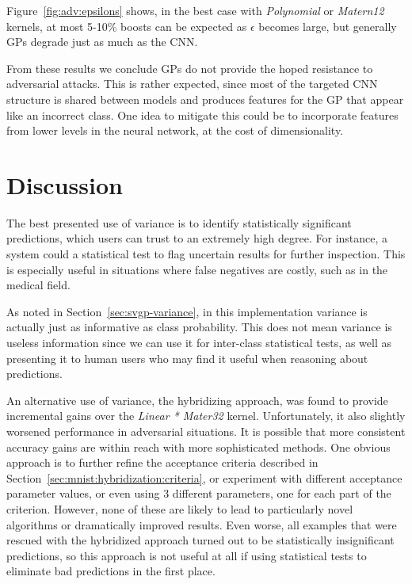 \documentclass{article}
\begin{document}
Figure~\ref{fig:adv:epsilons} shows, in the best case with \textit{Polynomial} or \textit{Matern12} kernels, at most 5-10\% boosts can be expected as $\epsilon$ becomes large, but generally GPs degrade just as much as the CNN. 

From these results we conclude GPs do not provide the hoped resistance to adversarial attacks. This is rather expected, since most of the targeted CNN structure is shared between models and produces features for the GP that appear like an incorrect class. One idea to mitigate this could be to incorporate features from lower levels in the neural network, at the cost of dimensionality.

\section{Discussion}
\label{sec:discussion}

The best presented use of variance is to identify statistically significant predictions, which users can trust to an extremely high degree. For instance, a system could a statistical test to flag uncertain results for further inspection. This is especially useful in situations where false negatives are costly, such as in the medical field. 

As noted in Section~\ref{sec:svgp-variance}, in this implementation variance is actually just as informative as class probability. This does not mean variance is useless information since we can use it for inter-class statistical tests, as well as presenting it to human users who may find it useful when reasoning about predictions.

An alternative use of variance, the hybridizing approach, was found to provide incremental gains over the \textit{Linear * Mater32} kernel. Unfortunately, it also slightly worsened performance in adversarial situations. It is possible that more consistent accuracy gains are within reach with more sophisticated methods. One obvious approach is to further refine the acceptance criteria described in Section~\ref{sec:mnist:hybridization:criteria}, or experiment with different acceptance parameter values, or even using 3 different parameters, one for each part of the criterion. However, none of these are likely to lead to particularly novel algorithms or dramatically improved results. Even worse, all examples that were rescued with the hybridized approach turned out to be statistically insignificant predictions, so this approach is not useful at all if using statistical tests to eliminate bad predictions in the first place.
\end{document}
